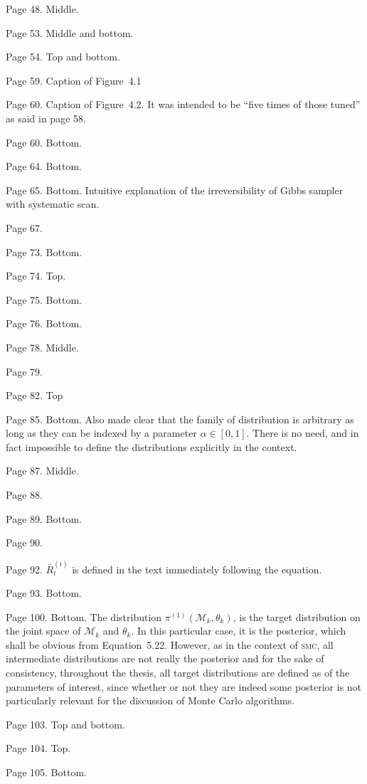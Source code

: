 \documentclass[11pt, fontset=Scala]{marticle}
\begin{document}
Page 48. Middle.

Page 53. Middle and bottom.

Page 54. Top and bottom.

Page 59. Caption of Figure~4.1

Page 60. Caption of Figure~4.2. It was intended to be ``five times of those tuned'' as said in page 58.

Page 60. Bottom.

Page 64. Bottom.

Page 65. Bottom. Intuitive explanation of the irreversibility of Gibbs sampler with systematic scan.

Page 67.

Page 73. Bottom.

Page 74. Top.

Page 75. Bottom.

Page 76. Bottom.

Page 78. Middle.

Page 79.

Page 82. Top

Page 85. Bottom. Also made clear that the family of distribution is arbitrary as long as they can be indexed by a parameter $\alpha \in [0, 1]$. There is no need, and in fact impossible to define the distributions explicitly in the context.

Page 87. Middle.

Page 88.

Page 89. Bottom.

Page 90.

Page 92. $\bar{R}_t^{(i)}$ is defined in the text immediately following the equation.

Page 93. Bottom.

Page 100. Bottom. The distribution $\pi^{(1)}(\mathcal{M}_k,\theta_k)$, is the target distribution on the joint space of $\mathcal{M}_k$ and $\theta_k$. In this particular case, it is the posterior, which shall be obvious from Equation~5.22. However, as in the context of \textsc{smc}, all intermediate distributions are not really the posterior and for the sake of consistency, throughout the thesis, all target distributions are defined as of the parameters of interest, since whether or not they are indeed some posterior is not particularly relevant for the discussion of Monte Carlo algorithms.

Page 103. Top and bottom.

Page 104. Top.

Page 105. Bottom.
\end{document}

